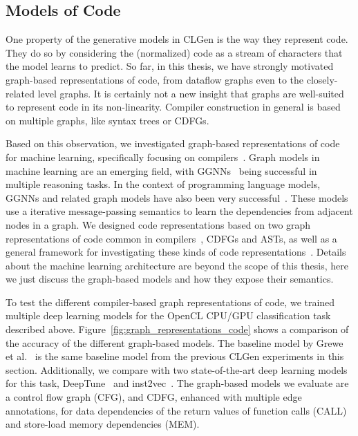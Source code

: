 \subsection{Models of Code}

One property of the generative models in CLGen is the way they represent code.
They do so by considering the (normalized) code as a stream of characters that the model learns to predict.
So far, in this thesis, we have strongly motivated graph-based representations of code, from dataflow graphs even to the closely-related level graphs.
It is certainly not a new insight that graphs are well-suited to represent code in its non-linearity.
Compiler construction in general is based on multiple graphs, like syntax trees or \acp{CDFG}.

Based on this observation, we investigated graph-based representations of code for machine learning, specifically focusing on compilers~\cite{brauckmann_cc20}.
Graph models in machine learning are an emerging field, with \acp{GGNN}~\cite{gnn} being successful in multiple reasoning tasks.
In the context of programming language models, \acp{GGNN} and related graph models have also been very successful~\cite{allamanis2017learning,cummins_programl,ye2020deep,paliwal2020graph}.
These models use a iterative message-passing semantics to learn the dependencies from adjacent nodes in a graph. 
We designed code representations based on two graph representations of code common in compilers~\cite{brauckmann_cc20}, \acp{CDFG} and \acp{AST}, as well as a general framework for investigating these kinds of code representations~\cite{brauckmann_fdl20}.
Details about the machine learning architecture are beyond the scope of this thesis, here we just discuss the graph-based models and how they expose their semantics.

To test the different compiler-based graph representations of code, we trained~\cite{brauckmann_cc20} multiple deep learning models for the OpenCL \ac{CPU}/\ac{GPU} classification task described above.
Figure~\ref{fig:graph_representations_code} shows a comparison of the accuracy of the different graph-based models.
The baseline model by Grewe et al.~\cite{grewe_cgo13} is the same baseline model from the previous CLGen experiments in this section.
Additionally, we compare with two state-of-the-art deep learning models for this task, DeepTune~\cite{cummins_pact17} and inst2vec~\cite{inst2vec}.
The graph-based models we evaluate are a control flow graph (CFG), and \acf{CDFG}, enhanced with multiple edge annotations, for data dependencies of the return values of function calls (CALL) and store-load memory dependencies (MEM).

